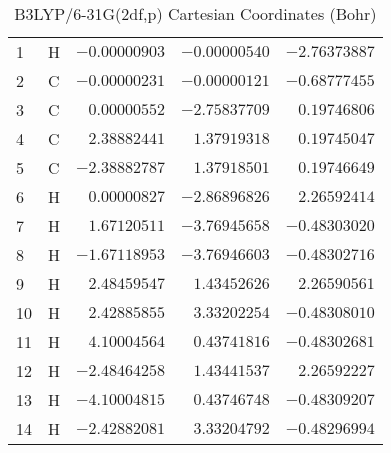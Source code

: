 \documentclass[10pt,oneside]{article}
\begin{document}
\begin{table}[h!]
\centering
\caption{B3LYP/6-31G(2df,p) Cartesian Coordinates (Bohr)}
\begin{tabular}{llrrr}
1  & H  & $-0.00000903$ & $-0.00000540$ & $-2.76373887$ \\
2  & C  & $-0.00000231$ & $-0.00000121$ & $-0.68777455$ \\
3  & C  & $ 0.00000552$ & $-2.75837709$ & $ 0.19746806$ \\
4  & C  & $ 2.38882441$ & $ 1.37919318$ & $ 0.19745047$ \\
5  & C  & $-2.38882787$ & $ 1.37918501$ & $ 0.19746649$ \\
6  & H  & $ 0.00000827$ & $-2.86896826$ & $ 2.26592414$ \\
7  & H  & $ 1.67120511$ & $-3.76945658$ & $-0.48303020$ \\
8  & H  & $-1.67118953$ & $-3.76946603$ & $-0.48302716$ \\
9  & H  & $ 2.48459547$ & $ 1.43452626$ & $ 2.26590561$ \\
10 & H  & $ 2.42885855$ & $ 3.33202254$ & $-0.48308010$ \\
11 & H  & $ 4.10004564$ & $ 0.43741816$ & $-0.48302681$ \\
12 & H  & $-2.48464258$ & $ 1.43441537$ & $ 2.26592227$ \\
13 & H  & $-4.10004815$ & $ 0.43746748$ & $-0.48309207$ \\
14 & H  & $-2.42882081$ & $ 3.33204792$ & $-0.48296994$ \\
\end{tabular}
\end{table}

\clearpage
\end{document}
